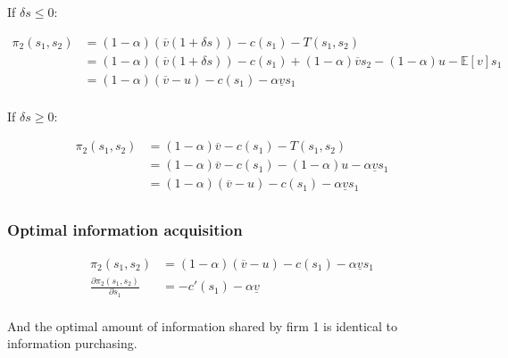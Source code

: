 \documentclass[a4paper,leqno]{article}%
\newcommand{\E}{\mathbb E}
\renewcommand{\a}{\alpha}
\newcommand{\uv}{\underline{v}}
\newcommand{\ov}{\overline{v}}
\begin{document}
If $\delta s\leq 0$:

\begin{equation}
    \begin{aligned}
      \pi_2(s_1,s_2)&=(1-\a)(\ov(1+\delta s))-c(s_1)-T(s_1,s_2)\\
                    &=(1-\a)(\ov(1+\delta s))-c(s_1)+(1-\a)\ov s_2-(1-\a)u-\E[v]s_1\\
                    &=(1-\a)(\ov-u)-c(s_1)-\a\uv s_1\\
    \end{aligned}
\end{equation}


If $\delta s\geq 0$:

\begin{equation}
    \begin{aligned}
      \pi_2(s_1,s_2)&=(1-\a)\ov-c(s_1)-T(s_1,s_2)\\
                    &=(1-\a)\ov-c(s_1)-(1-\a)u-\a \uv s_1\\
                    &=(1-\a)(\ov-u)-c(s_1)-\a\uv s_1\\
    \end{aligned}
\end{equation}

\subsubsection{Optimal information acquisition}


\medskip

\begin{equation}
    \begin{aligned}
      \pi_2(s_1,s_2)&=(1-\a)(\ov-u)-c(s_1)-\a \uv s_1\\
      \frac{\partial\pi_2(s_1,s_2)}{\partial s_1}&=-c'(s_1)-\a \uv \\
    \end{aligned}
\end{equation}

And the optimal amount of information shared by firm 1 is identical to information purchasing. 

\medskip
\end{document}
